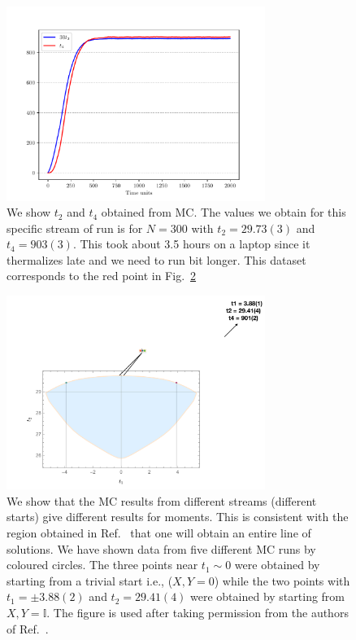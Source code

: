 \documentclass[11pt]{article}
\begin{document}
\begin{figure}[htbp] 
	\centering 
	\includegraphics[width=0.75\textwidth]{figs/2MM_symb_t2_t4.pdf}
	\caption{\label{fig:2MM_t2t4}We show $t_{2}$ and $t_{4}$ obtained from MC. 
	The values we obtain for this specific stream of run is for $N=300$ with $t_{2} = 29.73(3)$ and $t_{4} = 903(3)$. This took about 3.5 hours on a laptop since it thermalizes late and we need to run bit longer. This dataset corresponds to the red point in Fig.~\ref{fig:2MM_comp1}}
\end{figure}

\begin{figure}[h] 
	\centering 
	\includegraphics[width=0.75\textwidth]{figs/2MM_symb_ms.pdf}
	\caption{\label{fig:2MM_comp1}We show that the MC results from different streams (different starts) give different results for moments. This is consistent with the region obtained in Ref.~\cite{Kazakov:2021lel} that one will obtain an entire line of solutions. We have shown data from five different MC runs by coloured circles. The three points near $t_{1} \sim 0$ were obtained by starting from a trivial start i.e., ($X,Y = 0$) while the two points with $t_{1} = \pm 3.88(2)$ and $t_{2}=29.41(4)$ were obtained by starting from $X,Y = \mathbb{I}$. The figure is used after taking permission from the authors of Ref.~\cite{Kazakov:2021lel}.}
\end{figure}
\end{document}

